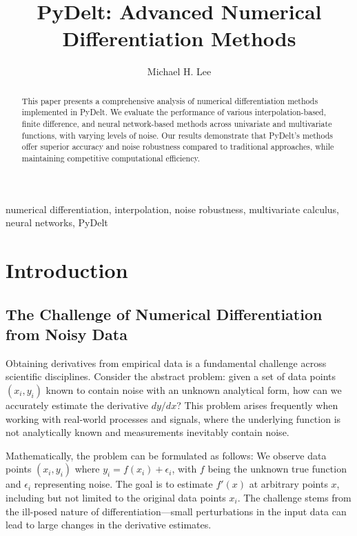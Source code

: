 \documentclass[10pt,journal,compsoc]{IEEEtran}
\begin{document}
\title{PyDelt: Advanced Numerical Differentiation Methods}

\author{Michael H. Lee}


\maketitle

\begin{abstract}
This paper presents a comprehensive analysis of numerical differentiation methods implemented in PyDelt. We evaluate the performance of various interpolation-based, finite difference, and neural network-based methods across univariate and multivariate functions, with varying levels of noise. Our results demonstrate that PyDelt's methods offer superior accuracy and noise robustness compared to traditional approaches, while maintaining competitive computational efficiency.
\end{abstract}

\begin{IEEEkeywords}
numerical differentiation, interpolation, noise robustness, multivariate calculus, neural networks, PyDelt
\end{IEEEkeywords}

\section{Introduction}

\subsection{The Challenge of Numerical Differentiation from Noisy Data}

Obtaining derivatives from empirical data is a fundamental challenge across scientific disciplines. Consider the abstract problem: given a set of data points $(x_i, y_i)$ known to contain noise with an unknown analytical form, how can we accurately estimate the derivative $dy/dx$? This problem arises frequently when working with real-world processes and signals, where the underlying function is not analytically known and measurements inevitably contain noise.

Mathematically, the problem can be formulated as follows: We observe data points $(x_i, y_i)$ where $y_i = f(x_i) + \epsilon_i$, with $f$ being the unknown true function and $\epsilon_i$ representing noise. The goal is to estimate $f'(x)$ at arbitrary points $x$, including but not limited to the original data points $x_i$. The challenge stems from the ill-posed nature of differentiation—small perturbations in the input data can lead to large changes in the derivative estimates.
\end{document}
